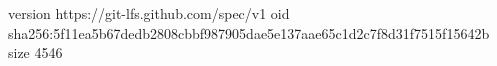 version https://git-lfs.github.com/spec/v1
oid sha256:5f11ea5b67dedb2808cbbf987905dae5e137aae65c1d2c7f8d31f7515f15642b
size 4546
